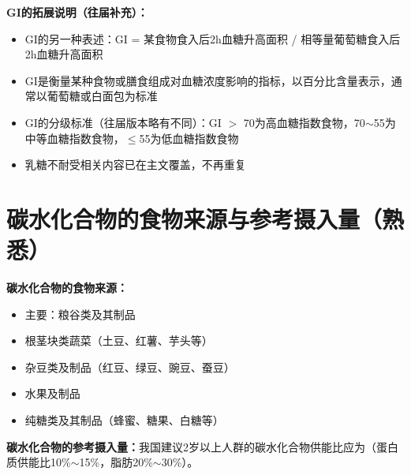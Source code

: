 \begin{tipbox}
\textbf{GI的拓展说明（往届补充）：}
\begin{itemize}[leftmargin=*]
    \item GI的另一种表述：GI = 某食物食入后2h血糖升高面积 / 相等量葡萄糖食入后2h血糖升高面积
    \item GI是衡量某种食物或膳食组成对血糖浓度影响的指标，以百分比含量表示，通常以葡萄糖或白面包为标准
    \item GI的分级标准（往届版本略有不同）：GI $>$ 70为高血糖指数食物，70$\sim$55为中等血糖指数食物，$\leq$55为低血糖指数食物
    \item 乳糖不耐受相关内容已在主文覆盖，不再重复
\end{itemize}
\end{tipbox}

\section{碳水化合物的食物来源与参考摄入量（熟悉）}

\begin{tipbox}
\textbf{碳水化合物的食物来源：}
\begin{itemize}[leftmargin=*]
    \item 主要：粮谷类及其制品
    \item 根茎块类蔬菜（土豆、红薯、芋头等）
    \item 杂豆类及制品（红豆、绿豆、豌豆、蚕豆）
    \item 水果及制品
    \item 纯糖类及其制品（蜂蜜、糖果、白糖等）
\end{itemize}

\textbf{碳水化合物的参考摄入量：}我国建议2岁以上人群的碳水化合物供能比应为（蛋白质供能比10\%$\sim$15\%，脂肪20\%$\sim$30\%）。
\end{tipbox}


